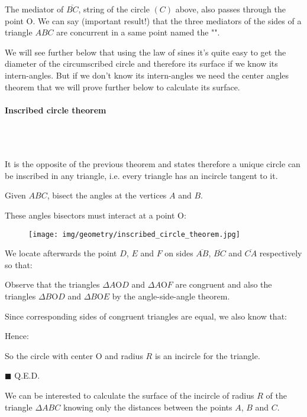 	\begin{tcolorbox}[title=Remark,colframe=black,arc=10pt]
	The mediator of $\overline{BC}$, string of the circle $(C)$ above, also passes through the point O. We can say (important result!) that the three mediators of the sides of a triangle $ABC$ are concurrent in a same point named the "".
	\end{tcolorbox}
	We will see further below that using the law of sines it's quite easy to get the diameter of the circumscribed circle and therefore its surface if we know its intern-angles. But if we don't know its intern-angles we need the center angles theorem that we will prove further below to calculate its surface.

	\paragraph{Inscribed circle theorem}\mbox{}\\\\
	\begin{theorem}
	It is the opposite of the previous theorem and states therefore a unique circle can be inscribed in any triangle, i.e. every triangle has an incircle tangent to it.
	\end{theorem}
	\begin{dem}
	Given $ABC$, bisect the angles at the vertices $A$ and $B$.

	These angles bisectors must interact at a point O:
	\begin{figure}[H]
		\centering
		\texttt{[image: img/geometry/inscribed\_circle\_theorem.jpg]}
	\end{figure}

	We locate afterwards the point $D$, $E$ and $F$ on sides $\overline{AB}$, $\overline{BC}$ and $\overline{CA}$ respectively so that:
	
	Observe that the triangles $\Delta A\text{O}D$ and $\Delta A\text{O}F$ are congruent and also the triangles $\Delta B\text{O}D$ and $\Delta B\text{O}E$ by the angle-side-angle theorem.
	
	Since corresponding sides of congruent triangles are equal, we also know that:
	
	Hence:
	
	So the circle with center O and radius $R$ is an incircle for the triangle.
	\begin{flushright}
		$\blacksquare$  Q.E.D.
	\end{flushright}
	\end{dem}
	We can be interested to calculate the surface of the incircle of radius $R$ of the triangle $\Delta ABC$ knowing only the distances between the points $A$, $B$ and $C$.
	

